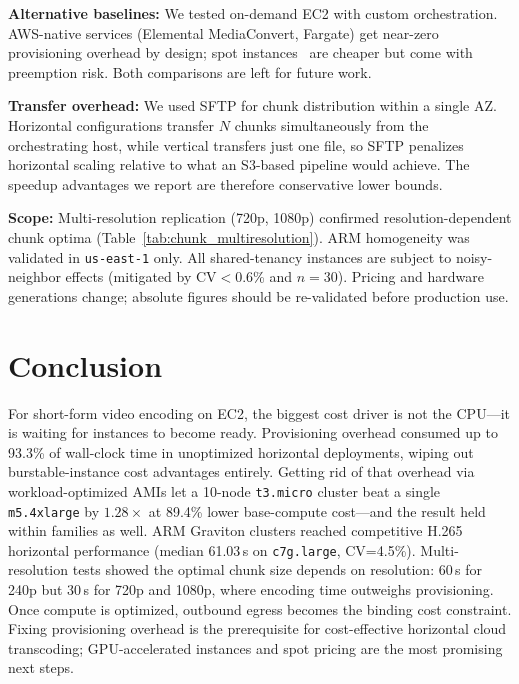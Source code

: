 \documentclass[conference]{IEEEtran}
\begin{document}
\textbf{Alternative baselines:} We tested on-demand EC2 with custom orchestration. AWS-native services (Elemental MediaConvert, Fargate) get near-zero provisioning overhead by design; spot instances~\cite{b21,b19} are cheaper but come with preemption risk. Both comparisons are left for future work.

\textbf{Transfer overhead:} We used SFTP for chunk distribution within a single AZ. Horizontal configurations transfer $N$ chunks simultaneously from the orchestrating host, while vertical transfers just one file, so SFTP penalizes horizontal scaling relative to what an S3-based pipeline would achieve. The speedup advantages we report are therefore conservative lower bounds.

\textbf{Scope:} Multi-resolution replication (720p, 1080p) confirmed resolution-dependent chunk optima (Table~\ref{tab:chunk_multiresolution}). ARM homogeneity was validated in \texttt{us-east-1} only. All shared-tenancy instances are subject to noisy-neighbor effects (mitigated by CV$<$0.6\% and $n=30$). Pricing and hardware generations change; absolute figures should be re-validated before production use.

\section{Conclusion}
\label{conclusion}

For short-form video encoding on EC2, the biggest cost driver is not the CPU---it is waiting for instances to become ready. Provisioning overhead consumed up to 93.3\% of wall-clock time in unoptimized horizontal deployments, wiping out burstable-instance cost advantages entirely. Getting rid of that overhead via workload-optimized AMIs let a 10-node \texttt{t3.micro} cluster beat a single \texttt{m5.4xlarge} by $1.28\times$ at 89.4\% lower base-compute cost---and the result held within families as well. ARM Graviton clusters reached competitive H.265 horizontal performance (median 61.03\,s on \texttt{c7g.large}, CV=4.5\%). Multi-resolution tests showed the optimal chunk size depends on resolution: 60\,s for 240p but 30\,s for 720p and 1080p, where encoding time outweighs provisioning. Once compute is optimized, outbound egress becomes the binding cost constraint. Fixing provisioning overhead is the prerequisite for cost-effective horizontal cloud transcoding; GPU-accelerated instances and spot pricing are the most promising next steps.
\end{document}
